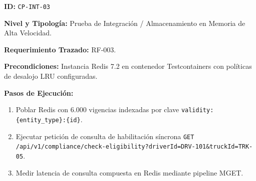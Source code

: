\par\noindent\textbf{ID:} \texttt{C\allowbreak{}P\allowbreak{}-\allowbreak{}I\allowbreak{}N\allowbreak{}T\allowbreak{}-\allowbreak{}0\allowbreak{}3\allowbreak{}}\par
\par\noindent\textbf{Nivel y Tipología:} Prueba de Integración / Almacenamiento en Memoria de Alta Velocidad.\par
\par\noindent\textbf{Requerimiento Trazado:} RF-003.\par
\par\noindent\textbf{Precondiciones:} Instancia Redis 7.2 en contenedor Testcontainers con políticas de desalojo LRU configuradas.\par
\par\noindent\textbf{Pasos de Ejecución:} \par
\begin{enumerate}
\item Poblar Redis con 6.000 vigencias indexadas por clave \texttt{v\allowbreak{}a\allowbreak{}l\allowbreak{}i\allowbreak{}d\allowbreak{}i\allowbreak{}t\allowbreak{}y\allowbreak{}:\allowbreak{}\{\allowbreak{}e\allowbreak{}n\allowbreak{}t\allowbreak{}i\allowbreak{}t\allowbreak{}y\allowbreak{}\_\allowbreak{}t\allowbreak{}y\allowbreak{}p\allowbreak{}e\allowbreak{}\}\allowbreak{}:\allowbreak{}\{\allowbreak{}i\allowbreak{}d\allowbreak{}\}\allowbreak{}}.
\item Ejecutar petición de consulta de habilitación síncrona \texttt{G\allowbreak{}E\allowbreak{}T\allowbreak{} /\allowbreak{}a\allowbreak{}p\allowbreak{}i\allowbreak{}/\allowbreak{}v\allowbreak{}1\allowbreak{}/\allowbreak{}c\allowbreak{}o\allowbreak{}m\allowbreak{}p\allowbreak{}l\allowbreak{}i\allowbreak{}a\allowbreak{}n\allowbreak{}c\allowbreak{}e\allowbreak{}/\allowbreak{}c\allowbreak{}h\allowbreak{}e\allowbreak{}c\allowbreak{}k\allowbreak{}-\allowbreak{}e\allowbreak{}l\allowbreak{}i\allowbreak{}g\allowbreak{}i\allowbreak{}b\allowbreak{}i\allowbreak{}l\allowbreak{}i\allowbreak{}t\allowbreak{}y\allowbreak{}?\allowbreak{}d\allowbreak{}r\allowbreak{}i\allowbreak{}v\allowbreak{}e\allowbreak{}r\allowbreak{}I\allowbreak{}d\allowbreak{}=\allowbreak{}D\allowbreak{}R\allowbreak{}V\allowbreak{}-\allowbreak{}1\allowbreak{}0\allowbreak{}1\allowbreak{}\&\allowbreak{}t\allowbreak{}r\allowbreak{}u\allowbreak{}c\allowbreak{}k\allowbreak{}I\allowbreak{}d\allowbreak{}=\allowbreak{}T\allowbreak{}R\allowbreak{}K\allowbreak{}-\allowbreak{}0\allowbreak{}5\allowbreak{}}.
\item Medir latencia de consulta compuesta en Redis mediante pipeline MGET.
\end{enumerate}
